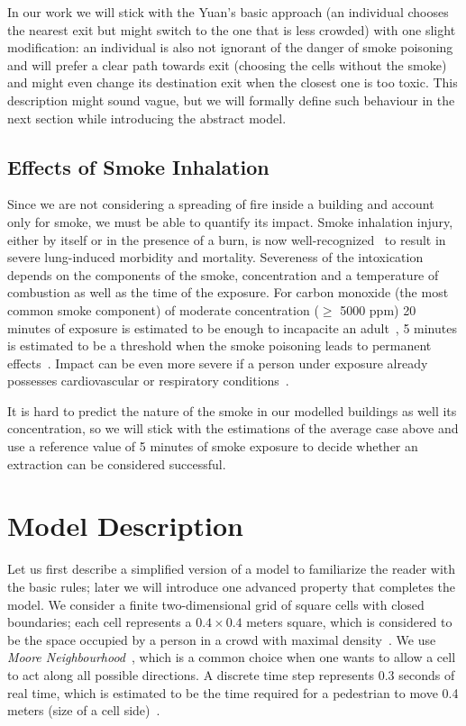 In our work we will stick with the Yuan's basic approach (an individual chooses
the nearest exit but might switch to the one that is less crowded) with one
slight modification: an individual is also not ignorant of the danger
of smoke poisoning and will prefer a clear path towards exit (choosing the
cells without the smoke) and might even change its destination exit when the
closest one is too toxic.
This description might sound vague, but we will formally define such behaviour
in the next section while introducing the abstract model.

\subsection{Effects of Smoke Inhalation}
Since we are not considering a spreading of fire inside a building and account
only for smoke, we must be able to quantify its impact.
Smoke inhalation injury, either by itself or in the presence of a burn, is now
well-recognized~\cite{NCBI} to result in severe lung-induced morbidity and
mortality.
Severeness of the intoxication depends on the components of the smoke,
concentration and a temperature of combustion as well as the time of the
exposure.
For carbon monoxide (the most common smoke component) of moderate concentration
($\geq$ 5000 ppm) 20 minutes of exposure is estimated to be enough to incapacite
an adult~\cite{CO1}, 5 minutes is estimated to be a threshold when
the smoke poisoning leads to permanent effects~\cite{NCBI, CO2}.
Impact can be even more severe if a person under exposure already possesses
cardiovascular or respiratory conditions~\cite{NCBI, Inhalation}.

It is hard to predict the nature of the smoke in our modelled buildings as well
its concentration, so we will stick with the estimations of the average case
above and use a reference value of 5 minutes of smoke exposure to decide
whether an extraction can be considered successful.

\section{Model Description}
Let us first describe a simplified version of a model to familiarize the reader
with the basic rules; later we will introduce one advanced property that
completes the model.
We consider a finite two-dimensional grid of square cells with closed
boundaries; each cell represents a $0.4 \times 0.4$ meters square, which is
considered to be the space occupied by a person in a crowd with maximal
density~\cite{Density1, Density2}.
We use \emph{Moore Neighbourhood}~\cite{Moore}, which is a common choice when
one wants to allow a cell to act along all possible directions.
A discrete time step represents 0.3 seconds of real time, which is estimated to
be the time required for a pedestrian to move 0.4 meters (size of a cell
side)~\cite{Density1}.

